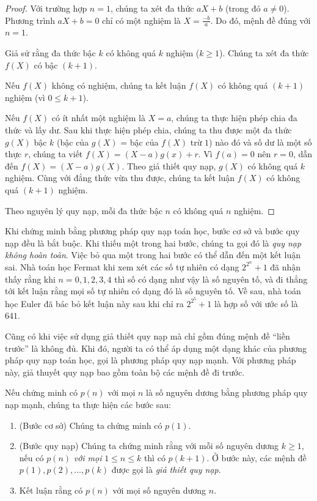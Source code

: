 \begin{proof}
    Với trường hợp $n = 1$, chúng ta xét đa thức $aX + b$ (trong đó $a\ne 0$). Phương trình $aX + b = 0$ chỉ có một nghiệm là $X = \frac{-b}{a}$. Do đó, mệnh đề đúng với $n = 1$.

    Giả sử rằng đa thức bậc $k$ có không quá $k$ nghiệm ($k\geq 1$). Chúng ta xét đa thức $f(X)$ có bậc $(k + 1)$.

    Nếu $f(X)$ không có nghiệm, chúng ta kết luận $f(X)$ có không quá $(k + 1)$ nghiệm (vì $0 \leq k + 1$).

    Nếu $f(X)$ có ít nhất một nghiệm là $X = a$, chúng ta thực hiện phép chia đa thức và lấy dư. Sau khi thực hiện phép chia, chúng ta thu được một đa thức $g(X)$ bậc $k$ (bậc của $g(X)$ = bậc của $f(X)$ trừ $1$) nào đó và số dư là một số thực $r$, chúng ta viết $f(X) = (X - a)g(x) + r$. Vì $f(a) = 0$ nên $r = 0$, dẫn đến $f(X) = (X - a)g(X)$. Theo giả thiết quy nạp, $g(X)$ có không quá $k$ nghiệm. Cùng với đẳng thức vừa thu được, chúng ta kết luận $f(X)$ có không quá $(k + 1)$ nghiệm.

    Theo nguyên lý quy nạp, mỗi đa thức bậc $n$ có không quá $n$ nghiệm.
\end{proof}

Khi chứng minh bằng phương pháp quy nạp toán học, bước cơ sở và bước quy nạp đều là bắt buộc. Khi thiếu một trong hai bước, chúng ta gọi đó là \textit{quy nạp không hoàn toàn}. Việc bỏ qua một trong hai bước có thể dẫn đến một kết luận sai. Nhà toán học Fermat khi xem xét các số tự nhiên có dạng $2^{2^{n}} + 1$ đã nhận thấy rằng khi $n = 0, 1, 2, 3, 4$ thì số có dạng như vậy là số nguyên tố, và đi thẳng tới kết luận rằng mọi số tự nhiên có dạng đó là số nguyên tố. Về sau, nhà toán học Euler đã bác bỏ kết luận này sau khi chỉ ra $2^{2^{5}} + 1$ là hợp số với ước số là $641$.

Cũng có khi việc sử dụng giả thiết quy nạp mà chỉ gồm đúng mệnh đề ``liền trước'' là không đủ. Khi đó, người ta có thể áp dụng một dạng khác của phương pháp quy nạp toán học, gọi là phương pháp quy nạp mạnh. Với phương pháp này, giả thuyết quy nạp bao gồm toàn bộ các mệnh đề đi trước.

Nếu chứng minh có $p(n)$ với mọi $n$ là số nguyên dương bằng phương pháp quy nạp mạnh, chúng ta thực hiện các bước sau:
\begin{enumerate}[label={\textbf{Bước \arabic*.}},itemindent=1cm]
    \item (Bước cơ sở) Chúng ta chứng minh có $p(1)$.
    \item (Bước quy nạp) Chúng ta chứng minh rằng với mỗi số nguyên dương $k\geq 1$, nếu có $p(n)$ \textit{với mọi} $1\leq n\leq k$ thì có $p(k+1)$. Ở bước này, các mệnh đề $p(1), p(2), \ldots, p(k)$ được gọi là \textit{giả thiết quy nạp}.
    \item Kết luận rằng có $p(n)$ với mọi số nguyên dương $n$.
\end{enumerate}

